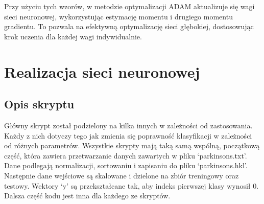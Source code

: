 \documentclass{article}
\begin{document}
Przy użyciu tych wzorów, w metodzie optymalizacji ADAM aktualizuje się wagi sieci neuronowej, wykorzystując estymację momentu i drugiego momentu gradientu.
To pozwala na efektywną optymalizację sieci głębokiej, dostosowując krok uczenia dla każdej wagi indywidualnie.

\newpage
\section{Realizacja sieci neuronowej}
\subsection{Opis skryptu}

Główny skrypt został podzielony na kilka innych w zależności od zastosowania.
Każdy z nich dotyczy tego jak zmienia się poprawność klasyfikacji w zależności od różnych parametrów.
Wszystkie skrypty mają taką samą wspólną, początkową część, która zawiera przetwarzanie danych zawartych w pliku `parkinsons.txt'.
Dane podlegają normalizacji, sortowaniu i zapisaniu do pliku `parkinsons.hkl'.
Następnie dane wejściowe są skalowane i dzielone na zbiór treningowy oraz testowy.
Wektory `y' są przekształcane tak, aby indeks pierwszej klasy wynosił 0.
Dalsza część kodu jest inna dla każdego ze skryptów.
\end{document}
